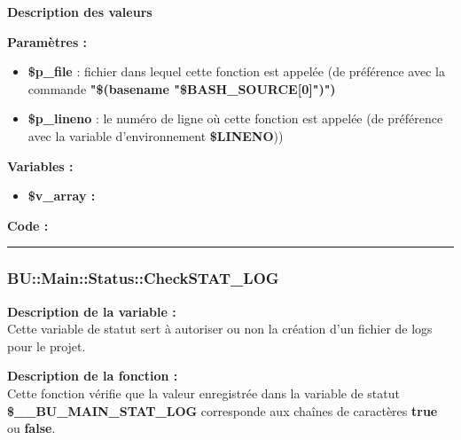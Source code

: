 \documentclass[a4paper,10pt]{article}
\begin{document}
\begin{justify}
    \textbf{Description des valeurs}
\end{justify}


\begin{justify}
    \textbf{Paramètres :}

    \begin{itemize}
        \item \color{orange}\textbf{\$p\_file}\color{white} : fichier dans lequel cette fonction est appelée (de préférence avec la commande \textbf{"\$(\color{gray}basename \color{white}"\color{orange}\$BASH\_SOURCE[0]\color{white}")")}\\

        \item \color{orange}\textbf{\$p\_lineno}\color{white} : le numéro de ligne où cette fonction est appelée (de préférence avec la variable d'environnement \textbf{\color{orange}\$LINENO}))
    \end{itemize}
\end{justify}

\begin{justify}
    \textbf{Variables :}

    \begin{itemize}
        \item \textbf{\color{orange}\$v\_array\color{white} :}
    \end{itemize}
\end{justify}

\begin{justify}
    \textbf{Code :}
\end{justify}



\color{blue}\par\noindent\rule{\textwidth}{0.4pt}\color{white}

\color{blue}
\subsubsection{\color{mauve}BU::Main::Status::CheckSTAT\_LOG}\color{white}

\begin{justify}
    \textbf{Description de la variable :}\\
    Cette variable de statut sert à autoriser ou non la création d'un fichier de logs pour le projet.
\end{justify}

\begin{justify}
    \textbf{Description de la fonction :}\\
    Cette fonction vérifie que la valeur enregistrée dans la variable de statut \textbf{\color{orange}\$\_\_BU\_MAIN\_STAT\_LOG} corresponde aux chaînes de caractères \textbf{true} ou \textbf{false}.
\end{justify}
\end{document}
